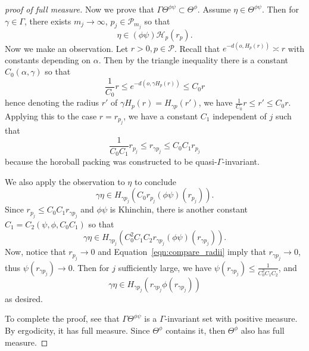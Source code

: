 \documentclass[11pt]{amsart}
\theoremstyle{plain}
\theoremstyle{definition}
\theoremstyle{remark}
\begin{document}
\begin{proof}[proof of full measure]
  Now we prove that $\Gamma \Theta^{\phi\psi}\subset \Theta^\phi$. Assume
  $\eta\in\Theta^{\phi\psi}$. Then for $\gamma\in\Gamma$, there exists
  $m_j\to\infty$, $p_j\in\mathcal P_{m_j}$ so that 
  \[
    \eta\in(\phi\psi)\mathcal H_p(r_p). 
  \]
  Now we make an observation. 
  Let $r>0,p\in\mathcal P$. Recall that $e^{-d(o,H_p(r))}\asymp r$ with
  constants depending on $\alpha$.  Then by the
  triangle inequality there is
  a constant $C_0(\alpha,\gamma)$ so that 
  \[
    \frac1{C_0}r\leq e^{-d(o,\gamma H_p(r))}\leq C_0r
  \]
  hence denoting the radius $r'$ of $\gamma H_p(r)=H_{\gamma p}(r')$, we
  have $\frac1{C_0} r \leq r' \leq C_0 r $. 
  Applying this to the case $r=r_{p_j}$, we have a constant $C_1$
  independent of $j$ such that
  \begin{equation}
  \frac1{C_0C_1}r_{p_j}\leq
  r_{\gamma p_j}\leq C_0C_1 r_{p_j}
    \label{eqn:compare_radii}
  \end{equation}
  because the horoball packing was
  constructed to be quasi-$\Gamma$-invariant. 

  We also apply the observation to $\eta$ to conclude 
  \[
    \gamma\eta\in H_{\gamma p_j}(C_0r_{p_j} (\phi\psi)(r_{p_j})).
  \]
  Since $r_{p_j}\leq C_0C_1 r_{\gamma p_j}$ and $\phi\psi$ is Khinchin,
  there is another constant $C_1=C_2(\psi,\phi,C_0C_1)$ so that 
  \[
    \gamma\eta\in H_{\gamma p_j}(C_0^2C_1C_2 r_{\gamma p_j}
    (\phi\psi)(r_{\gamma p_j})).
  \]
  Now, notice that $r_{p_j}\to 0$ and Equation~\eqref{eqn:compare_radii}
  imply that $r_{\gamma p_j}\to 0$, thus $\psi(r_{\gamma p_j})\to 0$. Then
  for $j$ sufficiently large, we have $\psi(r_{\gamma p_j})\leq
  \frac1{C_0^2C_1C_2}$, and 
  \[
    \gamma \eta\in H_{\gamma p_j}(r_{\gamma p_j}\phi(r_{\gamma p_{j}}))
  \]
  as desired.

  To complete the proof, see that $\Gamma \Theta^{\phi\psi}$ is a
  $\Gamma$-invariant set with positive measure. By ergodicity, it has full
  measure. Since $\Theta^\phi$ contains it, then $\Theta^\phi$ also has
  full measure. 
\end{proof}
\end{document}
